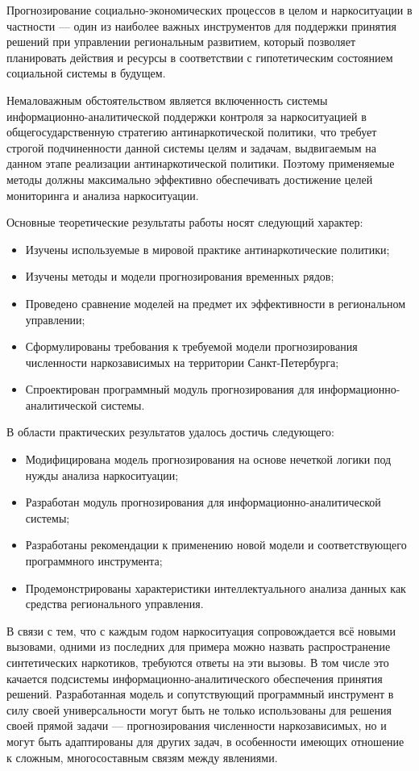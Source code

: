 Прогнозирование социально-экономических процессов в целом и наркоситуации в
частности --- один из наиболее важных инструментов для поддержки принятия
решений при управлении региональным развитием, который позволяет планировать
действия и ресурсы  в соответствии с гипотетическим состоянием социальной
системы в будущем.

Немаловажным обстоятельством является включенность системы
информационно-аналитической поддержки контроля за наркоситуацией в
общегосударственную стратегию антинаркотической политики, что требует строгой
подчиненности данной системы целям и задачам, выдвигаемым на данном этапе
реализации антинаркотической политики. Поэтому применяемые методы должны
максимально эффективно обеспечивать достижение целей мониторинга и анализа
наркоситуации.

Основные теоретические результаты работы носят следующий характер: 
\begin{itemize}
\item Изучены используемые в мировой практике антинаркотические политики;
\item Изучены методы и модели прогнозирования временных рядов;
\item Проведено сравнение моделей на предмет их эффективности в региональном
управлении;
\item Сформулированы требования к требуемой модели прогнозирования численности
наркозависимых на территории Санкт-Петербурга;
\item Спроектирован программный модуль прогнозирования для
информационно-аналитической системы.
\end{itemize}

В области практических результатов удалось достичь следующего:
\begin{itemize}
\item Модифицирована модель прогнозирования на основе нечеткой логики под нужды
анализа наркоситуации;
\item Разработан модуль прогнозирования для информационно-аналитической системы;
\item Разработаны рекомендации к применению новой модели и соответствующего
    программного инструмента;
\item Продемонстрированы характеристики интеллектуального анализа данных как
средства регионального управления.
\end{itemize}

В связи с тем, что с каждым годом наркоситуация сопровождается всё новыми
вызовами, одними из последних для примера можно назвать распространение
синтетических наркотиков, требуются ответы на эти вызовы. В том числе это
качается подсистемы информационно-аналитического обеспечения принятия решений.
Разработанная модель и сопутствующий  программный инструмент в силу своей
универсальности могут быть не только использованы для решения своей прямой
задачи --- прогнозирования численности наркозависимых, но и могут быть
адаптированы для других задач, в особенности имеющих отношение к сложным,
многосоставным связям между явлениями.

